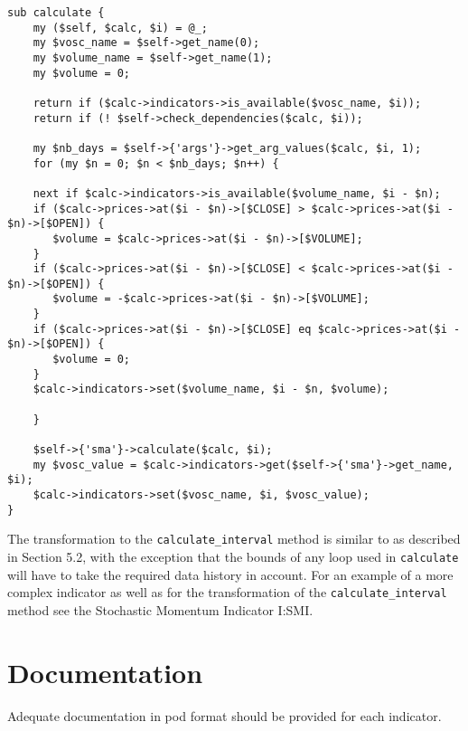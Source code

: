 \documentclass[11pt,twoside]{article}
\begin{document}
\begin{lstlisting}[numbers=none]
sub calculate {
    my ($self, $calc, $i) = @_;
    my $vosc_name = $self->get_name(0);
    my $volume_name = $self->get_name(1);
    my $volume = 0;

    return if ($calc->indicators->is_available($vosc_name, $i));
    return if (! $self->check_dependencies($calc, $i));

    my $nb_days = $self->{'args'}->get_arg_values($calc, $i, 1);
    for (my $n = 0; $n < $nb_days; $n++) {

    next if $calc->indicators->is_available($volume_name, $i - $n);
    if ($calc->prices->at($i - $n)->[$CLOSE] > $calc->prices->at($i - $n)->[$OPEN]) {
       $volume = $calc->prices->at($i - $n)->[$VOLUME];
    }
    if ($calc->prices->at($i - $n)->[$CLOSE] < $calc->prices->at($i - $n)->[$OPEN]) {
       $volume = -$calc->prices->at($i - $n)->[$VOLUME];
    }
    if ($calc->prices->at($i - $n)->[$CLOSE] eq $calc->prices->at($i - $n)->[$OPEN]) {
       $volume = 0;
    }
    $calc->indicators->set($volume_name, $i - $n, $volume);

    }

    $self->{'sma'}->calculate($calc, $i);
    my $vosc_value = $calc->indicators->get($self->{'sma'}->get_name, $i);
    $calc->indicators->set($vosc_name, $i, $vosc_value);
}
\end{lstlisting}
The transformation to the \lstinline!calculate_interval! method
is similar to as described in Section 5.2, with the exception that the
bounds of any loop used in \lstinline!calculate! will have to
take the required data history in account. For an example of a more
complex indicator as well as for the transformation of the
\lstinline!calculate_interval! method see the Stochastic
Momentum Indicator I:SMI.

\section{Documentation}
Adequate documentation in pod format should be provided for each
indicator.
\end{document}
